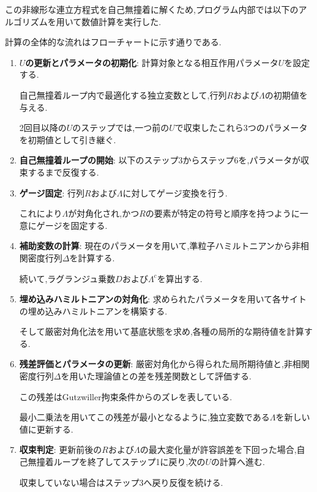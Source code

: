 この非線形な連立方程式を自己無撞着に解くため,プログラム内部では以下のアルゴリズムを用いて数値計算を実行した.

計算の全体的な流れはフローチャートに示す通りである.

\begin{enumerate}
    \item \textbf{$U$の更新とパラメータの初期化}:
    計算対象となる相互作用パラメータ$U$を設定する.

    自己無撞着ループ内で最適化する独立変数として,行列$R$および$\Lambda$の初期値を与える.

    2回目以降の$U$のステップでは,一つ前の$U$で収束したこれら3つのパラメータを初期値として引き継ぐ.
    
    \item \textbf{自己無撞着ループの開始}:
    以下のステップ3からステップ6を,パラメータが収束するまで反復する.
    
    \item \textbf{ゲージ固定}:
    行列$R$および$\Lambda$に対してゲージ変換を行う.

    これにより$\Lambda$が対角化され,かつ$R$の要素が特定の符号と順序を持つように一意にゲージを固定する.
    
    \item \textbf{補助変数の計算}:
    現在のパラメータを用いて,準粒子ハミルトニアンから非相関密度行列$\Delta$を計算する.

    続いて,ラグランジュ乗数$D$および$\Lambda^c$を算出する.
    
    \item \textbf{埋め込みハミルトニアンの対角化}:
    求められたパラメータを用いて各サイトの埋め込みハミルトニアンを構築する.

    そして厳密対角化法を用いて基底状態を求め,各種の局所的な期待値を計算する.
    
    \item \textbf{残差評価とパラメータの更新}:
    厳密対角化から得られた局所期待値と,非相関密度行列$\Delta$を用いた理論値との差を残差関数として評価する.

    この残差はGutzwiller拘束条件からのズレを表している.

    最小二乗法を用いてこの残差が最小となるように,独立変数である$\Lambda$を新しい値に更新する.
    
    \item \textbf{収束判定}:
    更新前後の$R$および$\Lambda$の最大変化量が許容誤差を下回った場合,自己無撞着ループを終了してステップ1に戻り,次の$U$の計算へ進む.

    収束していない場合はステップ3へ戻り反復を続ける.
\end{enumerate}

